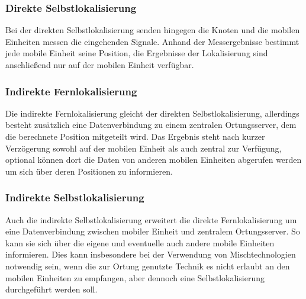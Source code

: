 \subsubsection{Direkte Selbstlokalisierung} 
Bei der direkten Selbstlokalisierung senden hingegen die Knoten und die mobilen Einheiten messen die eingehenden Signale. Anhand der Messergebnisse bestimmt jede mobile Einheit seine Position, die Ergebnisse der Lokalisierung sind anschließend nur auf der mobilen Einheit verfügbar. \\

\subsubsection{Indirekte Fernlokalisierung} 
Die indirekte Fernlokalisierung gleicht der direkten Selbstlokalisierung, allerdings besteht zusätzlich eine Datenverbindung zu einem zentralen Ortungsserver, dem die berechnete Position mitgeteilt wird. Das Ergebnis steht nach kurzer Verzögerung sowohl auf der mobilen Einheit als auch zentral zur Verfügung, optional können dort die Daten von anderen mobilen Einheiten abgerufen werden um sich über deren Positionen zu informieren. \\

\subsubsection{Indirekte Selbstlokalisierung} 
Auch die indirekte Selbstlokalisierung erweitert die direkte Fernlokalisierung um eine Datenverbindung zwischen mobiler Einheit und zentralem Ortungsserver. 
So kann sie sich über die eigene und eventuelle auch andere mobile Einheiten informieren. 
Dies kann insbesondere bei der Verwendung von Mischtechnologien notwendig sein, wenn die zur Ortung genutzte Technik es nicht erlaubt an den mobilen Einheiten zu empfangen, aber dennoch eine Selbstlokalisierung durchgeführt werden soll.

